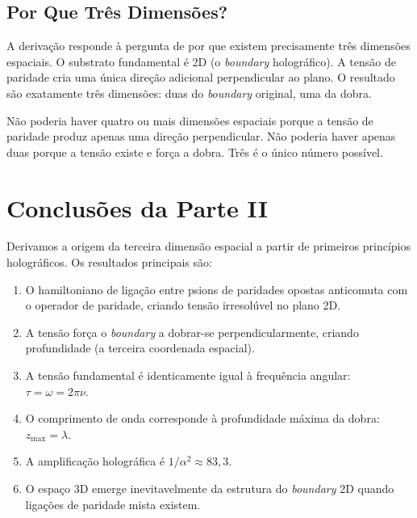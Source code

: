 \documentclass[12pt,a4paper,twoside]{article}
\newcommand{\alphaii}{\alpha^{2}}
\newcommand{\boundary}{\textit{boundary}}
\begin{document}
\subsection{Por Que Tr\^es Dimens\~oes?}

A deriva\c{c}\~ao responde \`a pergunta de por que existem precisamente tr\^es dimens\~oes espaciais. O substrato fundamental \'e 2D (o \boundary{} hologr\'afico). A tens\~ao de paridade cria uma \'unica dire\c{c}\~ao adicional perpendicular ao plano. O resultado s\~ao exatamente tr\^es dimens\~oes: duas do \boundary{} original, uma da dobra.

N\~ao poderia haver quatro ou mais dimens\~oes espaciais porque a tens\~ao de paridade produz apenas uma dire\c{c}\~ao perpendicular. N\~ao poderia haver apenas duas porque a tens\~ao existe e for\c{c}a a dobra. Tr\^es \'e o \'unico n\'umero poss\'ivel.


\section{Conclus\~oes da Parte II}


Derivamos a origem da terceira dimens\~ao espacial a partir de primeiros princ\'ipios hologr\'aficos. Os resultados principais s\~ao:

\begin{enumerate}[nosep]
\item O hamiltoniano de liga\c{c}\~ao entre psions de paridades opostas anticomuta com o operador de paridade, criando tens\~ao irresol\'uvel no plano 2D.
\item A tens\~ao for\c{c}a o \boundary{} a dobrar-se perpendicularmente, criando profundidade (a terceira coordenada espacial).
\item A tens\~ao fundamental \'e identicamente igual \`a frequ\^encia angular: $\tau = \omega = 2\pi\nu$.
\item O comprimento de onda corresponde \`a profundidade m\'axima da dobra: $z_{\max} = \lambda$.
\item A amplifica\c{c}\~ao hologr\'afica \'e $1/\alphaii \approx 83{,}3$.
\item O espa\c{c}o 3D emerge inevitavelmente da estrutura do \boundary{} 2D quando liga\c{c}\~oes de paridade mista existem.
\end{enumerate}
\end{document}
